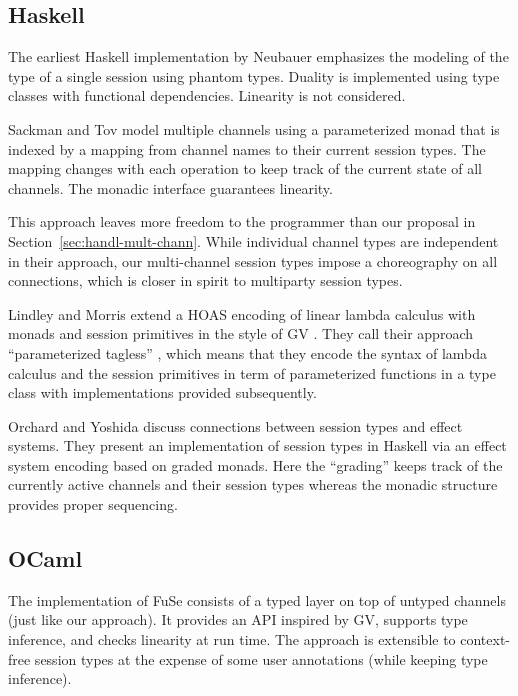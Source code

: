 \documentclass[acmsmall,review,anonymous,screen]{acmart}
\begin{document}
\subsection{Haskell}
\label{sec:hask-impl}

The earliest Haskell implementation by Neubauer \cite{DBLP:conf/padl/NeubauerT04}
emphasizes the modeling of the type of a single session using phantom
types. Duality is implemented using type classes with functional
dependencies. Linearity is not considered.

Sackman \cite{SackmanE08} and Tov \cite{DBLP:conf/popl/TovP11} model
multiple channels using a parameterized monad that is indexed by a mapping
from channel names to their current session types. The mapping changes
with each operation to keep track of the current state of all
channels. The monadic interface guarantees linearity.

This approach leaves more freedom to the programmer than our proposal
in Section~\ref{sec:handl-mult-chann}. While individual channel types
are independent in their approach, our multi-channel session types
impose a choreography on all connections, which is closer in spirit to
multiparty session types. 

Lindley and Morris \cite{DBLP:conf/haskell/LindleyM16} extend a HOAS
encoding of linear lambda calculus with monads and session primitives
in the style of GV \cite{DBLP:journals/jfp/GayV10}. They call their approach
``parameterized tagless'' \cite{DBLP:journals/jfp/CaretteKS09}, which means that they encode the syntax of
lambda calculus and the session primitives in term of parameterized
functions in a type class with implementations provided subsequently.

Orchard and Yoshida \cite{DBLP:conf/popl/OrchardY16} discuss
connections between session types and effect systems. They present an
implementation of session types in Haskell via an effect system
encoding based on graded monads. Here the ``grading'' keeps track of
the currently active channels and their session types whereas the
monadic structure provides proper sequencing.


\subsection{OCaml}
\label{sec:ocaml}

The implementation of FuSe \cite{DBLP:journals/jfp/Padovani17}
consists of a typed layer on top of untyped channels (just like our
approach).  It provides an API inspired by GV, supports
type inference, and checks linearity at run time. The approach is
extensible to context-free session types
\cite{DBLP:journals/toplas/Padovani19} at the expense of some user
annotations (while keeping type inference).
\end{document}
